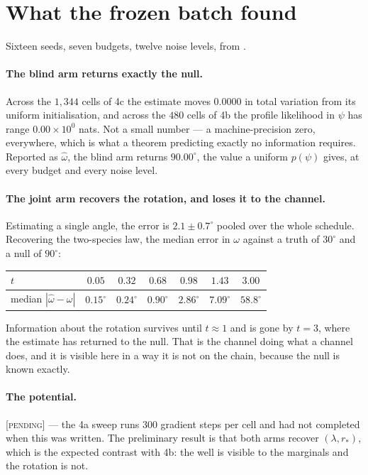 \section{What the frozen batch found}
\label{sec:ring-results}

Sixteen seeds, seven budgets, twelve noise levels, from .

\paragraph{The blind arm returns exactly the null.} Across the $1{,}344$ cells of 4c the
estimate moves $0.0000$ in total variation from its uniform initialisation, and across the $480$
cells of 4b the profile likelihood in $\psi$ has range $0.00\times10^{0}$ nats. Not a small
number --- a machine-precision zero, everywhere, which is what a theorem predicting exactly no
information requires. Reported as $\hat\omega$, the blind arm returns $90.00^\circ$, the value a
uniform $p(\psi)$ gives, at every budget and every noise level.

\paragraph{The joint arm recovers the rotation, and loses it to the channel.} Estimating a
single angle, the error is $2.1\pm0.7^\circ$ pooled over the whole schedule. Recovering the
two-species law, the median error in $\omega$ against a truth of $30^\circ$ and a null of
$90^\circ$:

\begin{center}\small
\begin{tabular}{@{}lcccccc@{}}
\toprule
$t$ & $0.05$ & $0.32$ & $0.68$ & $0.98$ & $1.43$ & $3.00$ \\
\midrule
median $|\hat\omega - \omega|$ & $0.15^\circ$ & $0.24^\circ$ & $0.90^\circ$ & $2.86^\circ$
& $7.09^\circ$ & $58.8^\circ$ \\
\bottomrule
\end{tabular}
\end{center}

\noindent
Information about the rotation survives until $t\approx1$ and is gone by $t=3$, where the
estimate has returned to the null. That is the channel doing what a channel does, and it is
visible here in a way it is not on the chain, because the null is known exactly.

\paragraph{The potential.} \textsc{[pending]} --- the 4a sweep runs 300 gradient steps per cell
and had not completed when this was written. The preliminary result is that both arms recover
$(\lambda, r_*)$, which is the expected contrast with 4b: the well is visible to the marginals
and the rotation is not.

